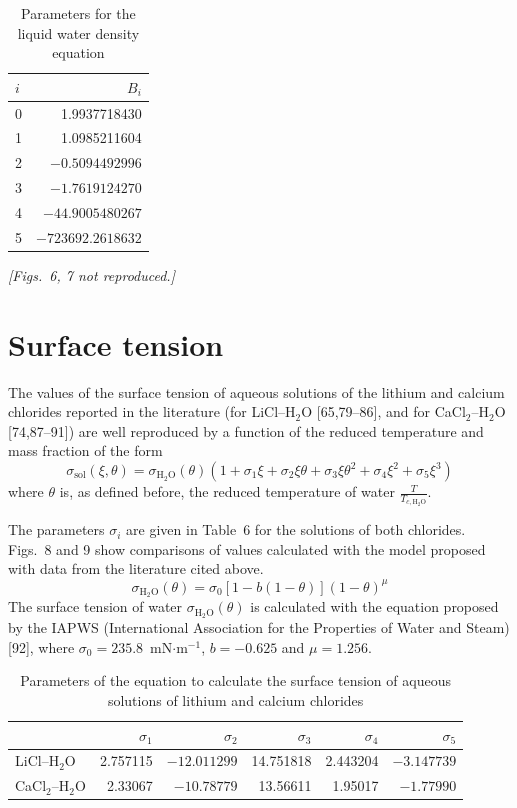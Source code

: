 \documentclass[11pt]{article}
\begin{document}
\begin{table}[htbp]
\centering
\caption{Parameters for the liquid water density equation}
\begin{tabular}{lr}
\toprule
$i$ & $B_i$ \\
\midrule
0 & 1.9937718430 \\
1 & 1.0985211604 \\
2 & $-0.5094492996$ \\
3 & $-1.7619124270$ \\
4 & $-44.9005480267$ \\
5 & $-723692.2618632$ \\
\bottomrule
\end{tabular}
\end{table}

\textit{[Figs.~6, 7 not reproduced.]}

\section{Surface tension}

The values of the surface tension of aqueous solutions of the lithium and calcium
chlorides reported in the literature (for LiCl--H$_2$O [65,79--86], and for
CaCl$_2$--H$_2$O [74,87--91]) are well reproduced by a function of the reduced temperature
and mass fraction of the form
\begin{equation}
\sigma_{\mathrm{sol}}(\xi,\theta) = \sigma_{\mathrm{H_2O}}(\theta)\left(1 + \sigma_1 \xi +
\sigma_2 \xi \theta + \sigma_3 \xi \theta^2 + \sigma_4 \xi^2 + \sigma_5 \xi^3\right)
\end{equation}
where $\theta$ is, as defined before, the reduced temperature of water
$\frac{T}{T_{c,\mathrm{H_2O}}}$.

The parameters $\sigma_i$ are given in Table~6 for the solutions of both chlorides.
Figs.~8 and 9 show comparisons of values calculated with the model proposed with data from
the literature cited above.
\begin{equation}
\sigma_{\mathrm{H_2O}}(\theta) = \sigma_0 \left[1 - b(1-\theta)\right](1-\theta)^{\mu}
\end{equation}
The surface tension of water $\sigma_{\mathrm{H_2O}}(\theta)$ is calculated with the
equation proposed by the IAPWS (International Association for the Properties of Water and
Steam) [92], where $\sigma_0 = 235.8$~mN$\cdot$m$^{-1}$, $b = -0.625$ and $\mu = 1.256$.

\begin{table}[htbp]
\centering
\caption{Parameters of the equation to calculate the surface tension of aqueous solutions
of lithium and calcium chlorides}
\begin{tabular}{lrrrrr}
\toprule
 & $\sigma_1$ & $\sigma_2$ & $\sigma_3$ & $\sigma_4$ & $\sigma_5$ \\
\midrule
LiCl--H$_2$O & 2.757115 & $-12.011299$ & 14.751818 & 2.443204 & $-3.147739$ \\
CaCl$_2$--H$_2$O & 2.33067 & $-10.78779$ & 13.56611 & 1.95017 & $-1.77990$ \\
\bottomrule
\end{tabular}
\end{table}
\end{document}
